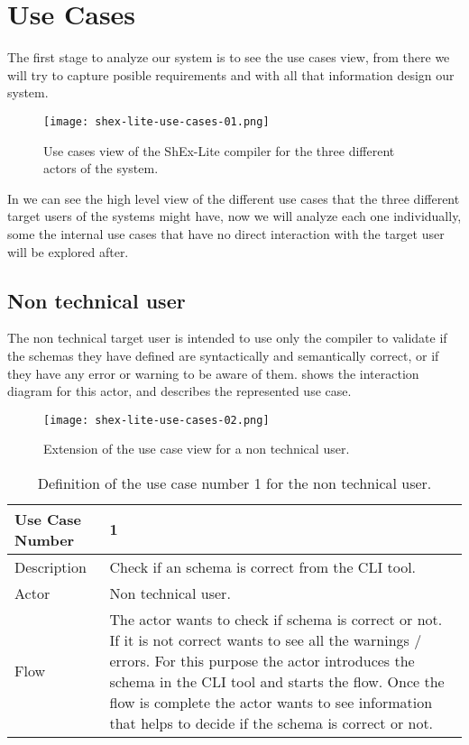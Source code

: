 \section{Use Cases}

The first stage to analyze our system is to see the use cases view, from there we will try to capture posible requirements and with all that information design our system.

\begin{figure}[hb]
    \texttt{[image: shex-lite-use-cases-01.png]}
    \caption[Use cases view of the ShEx-Lite compiler for the three different actors of the system]{Use cases view of the ShEx-Lite compiler for the three different actors of the system.}
\end{figure}

In  we can see the high level view of the different use cases that the three different target users of the systems might have, now we will analyze each one individually, some the internal use cases that have no direct interaction with the target user will be explored after.

\subsection{Non technical user}
The non technical target user is intended to use only the compiler to validate if the schemas they have defined are syntactically and semantically correct, or if they have any error or warning to be aware of them.  shows the interaction diagram for this actor, and  describes the represented use case.

\begin{figure}[hb]
    \texttt{[image: shex-lite-use-cases-02.png]}
    \caption[Extension of the use case view for a non technical user]{Extension of the use case view for a non technical user.}
\end{figure}

\begin{table}
    \begin{tabular}{ | m{2cm} | m{8cm}| }
        \toprule
        Use Case Number & 1 \\
        \midrule
        Description & Check if an schema is correct from the CLI tool. \\
        \midrule
        Actor & Non technical user. \\
        \midrule
        Flow & The actor wants to check if schema is correct or not. If it is not correct wants to see all the warnings / errors. For this purpose the actor introduces the schema in the CLI tool and starts the flow. Once the flow is complete the actor wants to see information that helps to decide if the schema is correct or not. \\
        \bottomrule
    \end{tabular}
    \caption[Definition of the use case number 1 for the non technical user]{Definition of the use case number 1 for the non technical user.}
\end{table}


